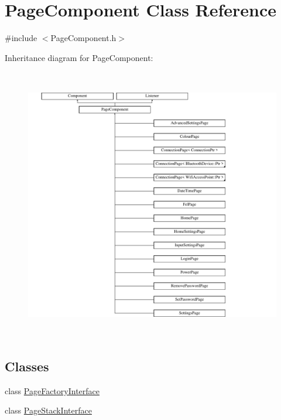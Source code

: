 \hypertarget{classPageComponent}{}\section{Page\+Component Class Reference}
\label{classPageComponent}


{\ttfamily \#include $<$Page\+Component.\+h$>$}

Inheritance diagram for Page\+Component\+:\begin{figure}[H]
\begin{center}
\leavevmode
\includegraphics[height=12.000000cm]{classPageComponent}
\end{center}
\end{figure}
\subsection*{Classes}
\begin{DoxyCompactItemize}
\item 
class \mbox{\hyperlink{classPageComponent_1_1PageFactoryInterface}{Page\+Factory\+Interface}}
\item 
class \mbox{\hyperlink{classPageComponent_1_1PageStackInterface}{Page\+Stack\+Interface}}
\end{DoxyCompactItemize}
